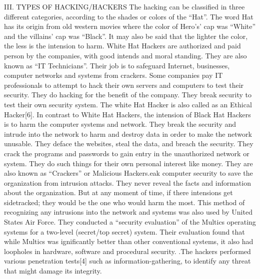 III. TYPES OF HACKING/HACKERS 
The hacking can be classified in three different categories, according to the shades or colors of the “Hat”. The word Hat has its origin from old western movies where the color of Hero’s’ cap was “White” and the villains’ cap was “Black”. It may also be said that the lighter the color, the 
less is the intension to harm. White Hat Hackers are authorized and paid person by the companies, with good intends and moral standing. They are also known as “IT Technicians”. Their job is to safeguard Internet, businesses, computer networks and systems from crackers. Some companies pay IT professionals to attempt to hack their own servers and computers to test their security. They do hacking for the benefit of the company. They break security to test their own security system. The white Hat Hacker is also called as an Ethical Hacker[6]. In contrast to White Hat Hackers, the intension of Black Hat Hackers is to harm the computer systems and network. They break the security and intrude into the network to harm and destroy data in order to make the network unusable. They deface the websites, steal the data, and breach the security. They crack the programs and passwords to gain entry in the unauthorized network or system. They do such things for their own personal interest like money. They are also 
known as “Crackers” or Malicious Hackers.eak computer security to save the organization from intrusion attacks. They never reveal the facts and information about the organization. But at any moment of time, if there intensions get sidetracked; they would be the one who would harm the most. This method of recognizing any intrusions into the network and systems was also used by United States Air Force. They conducted a “security evaluation” of the Multics operating systems for a two-level (secret/top secret) system. Their evaluation found that while Multics was ignificantly better than other conventional systems, it also had loopholes in hardware, software and procedural security. .The hackers performed various penetration tests[4] such as information-gathering, to identify any threat that might damage its integrity.  

